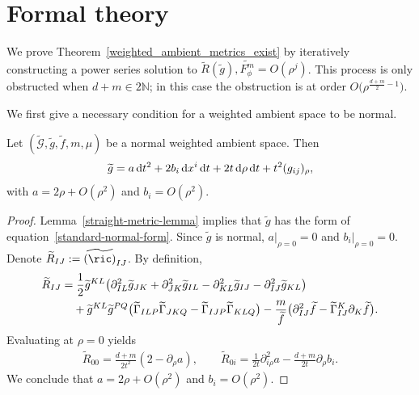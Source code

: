 \section{Formal theory}\label{formal-theory}

We prove Theorem~\ref{weighted_ambient_metrics_exist} by iteratively constructing a power series solution to $\widetilde{R}(\widetilde{g}),\widetilde{F_\phi^m}=O(\rho^j)$. This process is only obstructed when $d+m\in 2\mathbb{N}$; in this case the obstruction is at order $O\big(\rho^{\frac{d+m}{2}-1}\big)$.

We first give a necessary condition for a weighted ambient space to be normal.

\begin{Lemma}\label{ambient-metric-base-case}
Let $(\widetilde{\mathcal{G}},\widetilde{g},\widetilde{f},m,\mu)$ be a normal weighted ambient space. Then \begin{equation}\label{standard-normal-form}\widetilde{g}=a\,\mathrm{d}t^2+2b_i\, {\rm d}x^i \,\mathrm{d}t+ 2t\,{\rm d}\rho\, \mathrm{d}t+ t^2 (g_{ij})_\rho,\end{equation} with $a=2\rho+O(\rho^2)$ and $b_i=O(\rho^2)$.
\end{Lemma}

\begin{proof}
Lemma~\ref{straight-metric-lemma} implies that $\widetilde{g}$ has the form of equation~\eqref{standard-normal-form}. Since $\widetilde{g}$ is normal, $a|_{\rho=0}=0$ and $b_i|_{\rho=0}=0$. Denote $\widetilde{R}_{IJ}:=\widetilde{(\ric)}_{IJ}$.
By definition,
\begin{gather*}
\begin{split}
&\widetilde{R}_{IJ}=\frac{1}{2}\widetilde{g}^{KL}\big(\partial^2_{IL}\widetilde{g}_{JK} +\partial^2_{JK}\widetilde{g}_{IL}-\partial^2_{KL}\widetilde{g}_{IJ}-\partial^2_{IJ}\widetilde{g}_{KL}\big)
\\ &\hphantom{\widetilde{R}_{IJ}=}
{}+\widetilde{g}^{KL}\widetilde{g}^{PQ}\big(\widetilde{\Gamma}_{ILP}\widetilde{\Gamma}_{JKQ} -\widetilde{\Gamma}_{IJP}\widetilde{\Gamma}_{KLQ}\big)
-\frac{m}{\widetilde{f}}\big(\partial^2_{IJ}\widetilde{f} -\widetilde{\Gamma}^K_{IJ}\partial_K\widetilde{f}\big).
\end{split}
\end{gather*}
Evaluating at $\rho=0$ yields
\begin{gather*}
\widetilde{R}_{00}= \frac{d+m}{2t^2}(2-\partial_{\rho}a),
\qquad
\widetilde{R}_{0i}=\frac{1}{2t}\partial^2_{i\rho}a -\frac{d+m}{2t}\partial_{\rho}b_i.
\end{gather*}
We conclude that $a=2\rho+O(\rho^2)$ and $b_i=O(\rho^2)$.
\end{proof}

